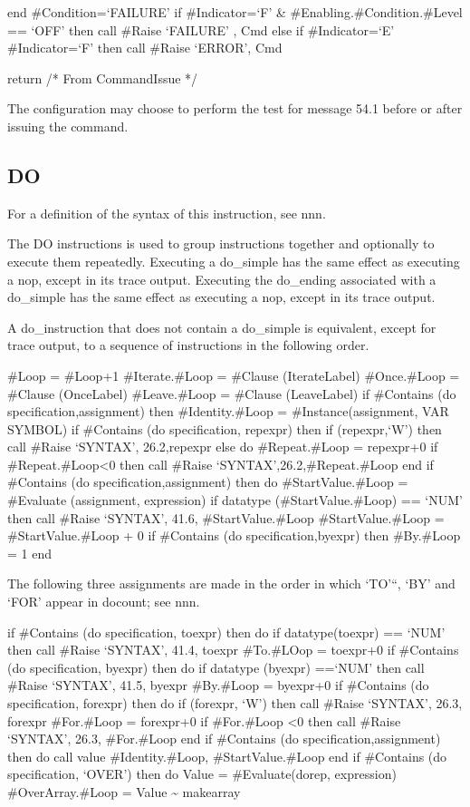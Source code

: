 end \#Condition=`FAILURE' if \#Indicator=`F' \&
\#Enabling.\#Condition.\#Level == `OFF' then call \#Raise `FAILURE' ,
Cmd else if \#Indicator=`E' \textbar{} \#Indicator=`F' then call \#Raise
`ERROR', Cmd

return /* From CommandIssue */

The configuration may choose to perform the test for message 54.1 before
or after issuing the command.

\hypertarget{do}{%
\subsection{DO}\label{do}}

For a definition of the syntax of this instruction, see nnn.

The DO instructions is used to group instructions together and
optionally to execute them repeatedly. Executing a do\_simple has the
same effect as executing a nop, except in its trace output. Executing
the do\_ending associated with a do\_simple has the same effect as
executing a nop, except in its trace output.

A do\_instruction that does not contain a do\_simple is equivalent,
except for trace output, to a sequence of instructions in the following
order.

\#Loop = \#Loop+1 \#Iterate.\#Loop = \#Clause (IterateLabel)
\#Once.\#Loop = \#Clause (OnceLabel) \#Leave.\#Loop = \#Clause
(LeaveLabel) if \#Contains (do specification,assignment) then
\#Identity.\#Loop = \#Instance(assignment, VAR SYMBOL) if \#Contains (do
specification, repexpr) then if \datatype(repexpr,`W') then call \#Raise
`SYNTAX', 26.2,repexpr else do \#Repeat.\#Loop = repexpr+0 if
\#Repeat.\#Loop\textless0 then call \#Raise
`SYNTAX',26.2,\#Repeat.\#Loop end if \#Contains (do
specification,assignment) then do \#StartValue.\#Loop = \#Evaluate
(assignment, expression) if datatype (\#StartValue.\#Loop) == `NUM' then
call \#Raise `SYNTAX', 41.6, \#StartValue.\#Loop \#StartValue.\#Loop =
\#StartValue.\#Loop + 0 if \#Contains (do specification,byexpr) then
\#By.\#Loop = 1 end

The following three assignments are made in the order in which `TO'``,
`BY' and `FOR' appear in docount; see nnn.

if \#Contains (do specification, toexpr) then do if datatype(toexpr) ==
`NUM' then call \#Raise `SYNTAX', 41.4, toexpr \#To.\#LOop = toexpr+0 if
\#Contains (do specification, byexpr) then do if datatype (byexpr)
==`NUM' then call \#Raise `SYNTAX', 41.5, byexpr \#By.\#Loop = byexpr+0
if \#Contains (do specification, forexpr) then do if \datatype(forexpr,
`W') then call \#Raise `SYNTAX', 26.3, forexpr \#For.\#Loop = forexpr+0
if \#For.\#Loop \textless0 then call \#Raise `SYNTAX', 26.3,
\#For.\#Loop end if \#Contains (do specification,assignment) then do
call value \#Identity.\#Loop, \#StartValue.\#Loop end if \#Contains (do
specification, `OVER') then do Value = \#Evaluate(dorep, expression)
\#OverArray.\#Loop = Value \textasciitilde{} makearray

